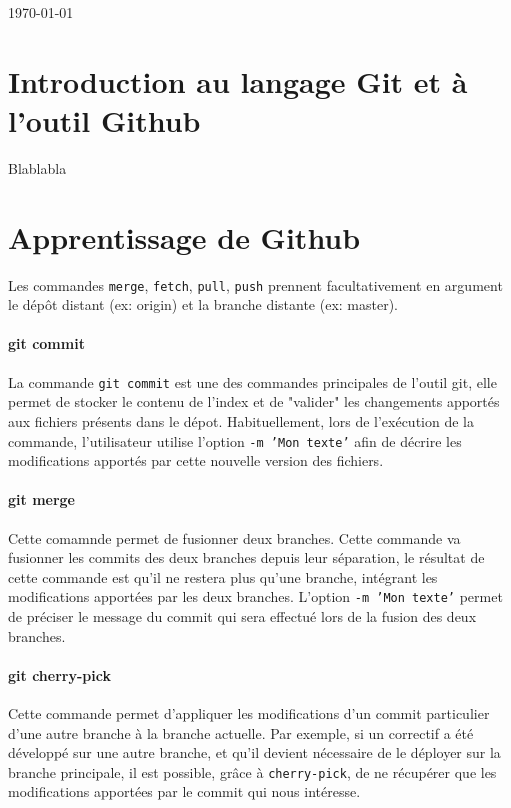 \documentclass[11pt,canadien]{article}
\begin{document}
\begin{titlepage}

{\large \today}\\[2cm]

\vfill %

\end{titlepage}

\newpage
\tableofcontents

\newpage
\section{Introduction au langage Git et à l'outil Github}
Blablabla

\newpage
\section{Apprentissage de Github}
Les commandes \texttt{merge}, \texttt{fetch}, \texttt{pull}, \texttt{push} prennent facultativement en argument le dépôt distant (ex: origin) et la branche distante (ex: master).

\paragraph{git commit}La commande \texttt{git commit} est une des commandes principales de l'outil git, elle permet de stocker le contenu de l'index et de "valider" les changements apportés aux fichiers présents dans le dépot. Habituellement, lors de
l'exécution de la commande, l'utilisateur utilise l'option \texttt{-m 'Mon texte'} afin de décrire les modifications apportés par cette nouvelle version des fichiers. 

\paragraph{git merge}Cette comamnde permet de fusionner deux branches. Cette commande va fusionner les commits des deux branches depuis leur séparation, le résultat de cette commande est qu'il ne restera plus qu'une branche, intégrant les
modifications apportées par les deux branches. L'option \texttt{-m 'Mon texte'} permet de préciser le message du commit qui sera effectué lors de la fusion des deux branches.

\paragraph{git cherry-pick}Cette commande permet d'appliquer les modifications d'un commit particulier d'une autre branche à la branche actuelle. Par exemple, si un correctif a été développé sur une autre branche, et qu'il devient nécessaire
de le déployer sur la branche principale, il est possible, grâce à \texttt{cherry-pick}, de ne récupérer que les modifications apportées par le commit qui nous intéresse.
\end{document}
